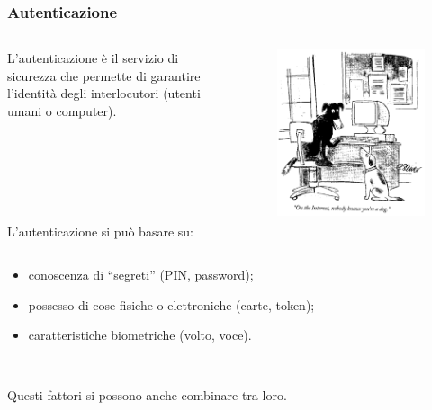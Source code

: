 \documentclass[]{beamer}
\begin{document}
\begin{frame}
\frametitle{Autenticazione}
\begin{columns}
\begin{column}{.6\textwidth}
  L'autenticazione è il servizio di sicurezza che permette di garantire l’identità degli interlocutori (utenti umani o computer).\pause

  ~

  ~

  ~

  L'autenticazione si può basare su:
\end{column}
\begin{column}{.3\textwidth}
  \begin{figure}
    \includegraphics[width=\columnwidth]{img/dog.png}
  \end{figure}
\end{column}
\end{columns}
\begin{itemize}
  \item conoscenza di ``segreti'' (PIN, password);\pause
  \item possesso di cose fisiche o elettroniche (carte, token);\pause
  \item caratteristiche biometriche (volto, voce).\pause
\end{itemize}

~

Questi fattori si possono anche combinare tra loro.
\end{frame}
\end{document}
